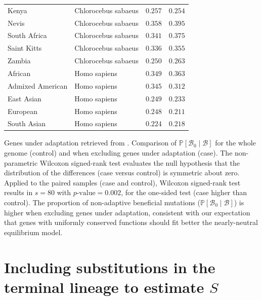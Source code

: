 \documentclass{article}
\newcommand{\proba}{\mathbb{P}}
\newcommand{\SphyBen}{\mathcal{B}_0}
\newcommand{\given}{\mid}
\newcommand{\Spop}{S}
\newcommand{\SpopBen}{\mathcal{B}}
\newcommand{\pvalue}{p\text{-value}}
\begin{document}
\begin{center}
\begin{tabular}{|l|l|r|r|}
            \rowcolor{LIGHTGREY} Kenya & Chlorocebus sabaeus & $ 0.257$ & $ 0.254$ \\
            \rowcolor{LIGHTGREY} Nevis & Chlorocebus sabaeus & $ 0.358$ & $ 0.395$ \\
            \rowcolor{LIGHTGREY} South Africa & Chlorocebus sabaeus & $ 0.341$ & $ 0.375$ \\
            \rowcolor{LIGHTGREY} Saint Kitts & Chlorocebus sabaeus & $ 0.336$ & $ 0.355$ \\
            \rowcolor{LIGHTGREY} Zambia & Chlorocebus sabaeus & $ 0.250$ & $ 0.263$ \\
            African & Homo sapiens & $ 0.349$ & $ 0.363$ \\
            Admixed American & Homo sapiens & $ 0.345$ & $ 0.312$ \\
            East Asian & Homo sapiens & $ 0.249$ & $ 0.233$ \\
            European & Homo sapiens & $ 0.248$ & $ 0.211$ \\
            South Asian & Homo sapiens & $ 0.224$ & $ 0.218$ \\
            \bottomrule
        \end{tabular}
    \end{center}
    Genes under adaptation retrieved from \textcite{latrille_genes_2023}.
    Comparison of $\proba[\SphyBen\given \SpopBen ]$ for the whole genome (control) and when excluding genes under adaptation (case).
    The non-parametric Wilcoxon signed-rank test evaluates the null hypothesis that the distribution of the differences (case versus control) is symmetric about zero.
    Applied to the paired samples (case and control), Wilcoxon signed-rank test results in $s=80$ with $\pvalue=0.002$, for the one-sided test (case higher than control).
    The proportion of non-adaptive beneficial mutations ($\proba[\SphyBen\given \SpopBen ]$) is higher when excluding genes under adaptation, consistent with our expectation that genes with uniformly conserved functions should fit better the nearly-neutral equilibrium model.

    \newpage

    \section{Including substitutions in the terminal lineage to estimate $\Spop$}
\end{document}

